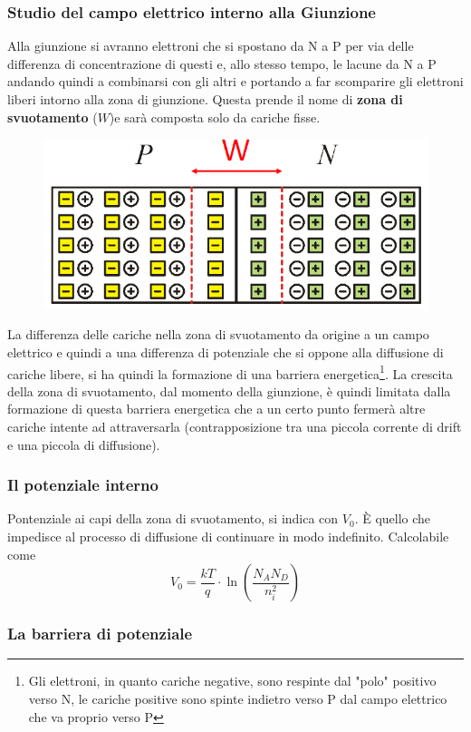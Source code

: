 \documentclass[11pt,a4paper,]{article}
\begin{document}
\subsubsection{Studio del campo elettrico interno alla Giunzione}
Alla giunzione si avranno elettroni che si spostano da N a P per via delle differenza di concentrazione di questi e, allo stesso tempo, le lacune da N a P andando quindi a combinarsi con gli altri e portando a far scomparire gli elettroni liberi intorno alla zona di giunzione.
Questa prende il nome di \textbf{zona di svuotamento} ($W$)e sarà composta solo da cariche fisse.
\begin{figure}[H]
    \centering
    \includegraphics[width=0.5\linewidth]{img/zon svuot.png}
\end{figure}
La differenza delle cariche nella zona di svuotamento da origine a un campo elettrico e quindi a una differenza di potenziale che si oppone alla diffusione di cariche libere, si ha quindi la formazione di una barriera energetica\footnote{Gli elettroni, in quanto cariche negative, sono respinte dal "polo" positivo verso N, le cariche positive sono spinte indietro verso P dal campo elettrico che va proprio verso P}.
La crescita della zona di svuotamento, dal momento della giunzione, è quindi limitata dalla formazione di questa barriera energetica che a un certo punto fermerà altre cariche intente ad attraversarla (contrapposizione tra una piccola corrente di drift e una piccola di diffusione).
\subsubsection{Il potenziale interno}
\begin{definizione}
    Pontenziale ai capi della zona di svuotamento, si indica con $V_0$.
    È quello che impedisce al processo di diffusione di continuare in modo indefinito.
    Calcolabile come
    \[
    V_0 = \frac{kT}{q} \cdot \ln\left(\frac{N_A N_D}{n_i^2}\right)
    \]
\end{definizione}
\subsubsection{La barriera di potenziale}
\end{document}
